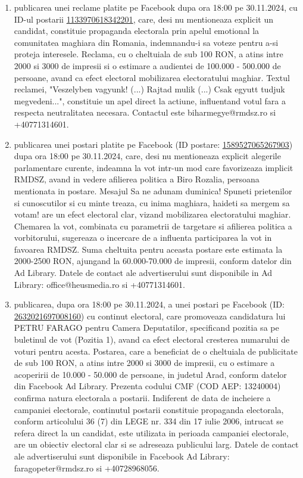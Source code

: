 \documentclass[a4paper,12pt]{article}
\begin{document}
\begin{enumerate}[leftmargin=*, label=\arabic*.)]
    \item publicarea unei reclame platite pe Facebook dupa ora 18:00 pe 30.11.2024, cu ID-ul postarii \href{https://www.facebook.com/ads/library/?id=1133970618342201}{1133970618342201}, care, desi nu mentioneaza explicit un candidat, constituie propaganda electorala prin apelul emotional la comunitatea maghiara din Romania, indemnandu-i sa voteze pentru a-si proteja interesele.  Reclama, cu o cheltuiala de sub 100 RON, a atins intre 2000 si 3000 de impresii si o estimare a audientei de 100.000 - 500.000 de persoane, avand ca efect electoral mobilizarea electoratului maghiar.  Textul reclamei, "Veszelyben vagyunk! (...) Rajtad mulik (...) Csak egyutt tudjuk megvedeni...",  constituie un apel direct la actiune, influentand votul fara a respecta neutralitatea necesara.  Contactul este biharmegye@rmdsz.ro si +40771314601.
    \item publicarea unei postari platite pe Facebook (ID postare: \href{https://www.facebook.com/ads/library/?id=1589527065267903}{1589527065267903}) dupa ora 18:00 pe 30.11.2024, care, desi nu mentioneaza explicit alegerile parlamentare curente, indeamna la vot intr-un mod care favorizeaza implicit RMDSZ, avand in vedere afilierea politica a Biro Rozalia, persoana mentionata in postare.  Mesajul Sa ne adunam duminica! Spuneti prietenilor si cunoscutilor si cu minte treaza, cu inima maghiara, haideti sa mergem sa votam! are un efect electoral clar, vizand mobilizarea electoratului maghiar.  Chemarea la vot, combinata cu parametrii de targetare si afilierea politica a vorbitorului, sugereaza o incercare de a influenta participarea la vot in favoarea RMDSZ.  Suma cheltuita pentru aceasta postare este estimata la 2000-2500 RON, ajungand la 60.000-70.000 de impresii, conform datelor din Ad Library.  Datele de contact ale advertiserului sunt disponibile in Ad Library: office@heusmedia.ro si +40771314601.
    \item publicarea, dupa ora 18:00 pe 30.11.2024, a unei postari pe Facebook (ID: \href{https://www.facebook.com/ads/library/?id=2632021697008160}{2632021697008160}) cu continut electoral, care promoveaza candidatura lui PETRU FARAGO pentru Camera Deputatilor, specificand pozitia sa pe buletinul de vot (Pozitia 1), avand ca efect electoral cresterea numarului de voturi pentru acesta. Postarea, care a beneficiat de o cheltuiala de publicitate de sub 100 RON, a atins intre 2000 si 3000 de impresii, cu o estimare a acoperirii de 10.000 - 50.000 de persoane, in judetul Arad, conform datelor din Facebook Ad Library.  Prezenta codului CMF (COD AEP: 13240004) confirma natura electorala a postarii.  Indiferent de data de incheiere a campaniei electorale, continutul postarii constituie propaganda electorala, conform articolului 36 (7) din LEGE nr. 334 din 17 iulie 2006, intrucat se refera direct la un candidat, este utilizata in perioada campaniei electorale, are un obiectiv electoral clar si se adreseaza publicului larg.  Datele de contact ale advertiserului sunt disponibile in Facebook Ad Library: faragopeter@rmdsz.ro si +40728968056.

\end{enumerate}
\end{document}

